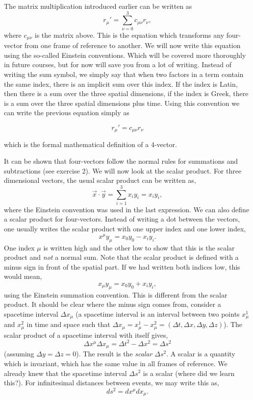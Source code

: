 {\begin{multicols}{2}
The matrix multiplication introduced earlier can be written as
\[
r_\mu'=\sum_{\nu=0}^3c_{\mu\nu}r_\nu,
\]
where $c_{\mu\nu}$ is the matrix above. This is the equation which transforms any four-vector from one frame of reference to another. We will now write this equation using the so-called Einstein conventions. Which will be covered more thoroughly in future courses, but for now will save you from a lot of writing. Instead of writing the sum symbol, we simply say that when two factors in a term contain the same index, there is an implicit sum over this index. If the index is Latin, then there is a sum over the three spatial dimensions, if the index is Greek, there is a sum over the three spatial dimensions plus time. Using this convention we can write the previous equation simply as
\begin{formbox}
\begin{equation}
\label{eq:lorentz}
r_\mu'=c_{\mu\nu}r_\nu
\end{equation}
\end{formbox}
which is the formal mathematical definition of a 4-vector.

It can be shown that four-vectors follow the normal rules for summations and subtractions (see exercise 2). We will now look at the scalar product. For three dimensional vectors, the usual scalar product can be written as,
\[
\vec{x}\cdot\vec{y}=\sum_{i=1}^3x_iy_i=x_iy_i,
\]
where the Einstein convention was used in the last expression. We can also define a scalar product for four-vectors. Instead of writing a dot between the vectors, one usually writes the scalar product with one upper index and one lower index,
\[
x^\mu y_\mu=x_0y_0-x_iy_i.
\]
One index $\mu$ is written high and the other low to show that this is the scalar product and \emph{not} a normal sum. Note that the scalar product is defined with a minus sign in front of the spatial part. If we had written both indices low, this would mean,
\[
x_\mu y_\mu=x_0y_0+x_iy_i,
\]
using the Einstein summation convention. This is different from the scalar product. It should be clear where the minus sign comes from, consider a spacetime interval $\Delta x_\mu$ (a spacetime interval is an interval between two points $x_\mu^1$ and $x_\mu^2$ in time and space such that $\Delta x_\mu=x_\mu^1-x_\mu^2=(\Delta t,\Delta x,\Delta y,\Delta z)$). The scalar product of a spacetime interval with itself gives,
\[
\Delta x^\mu\Delta x_\mu=\Delta t^2-\Delta x^2=\Delta s^2
\]
(assuming $\Delta y=\Delta z=0$). The result is the {\it scalar\label{pg:scalar}} $\Delta s^2$. A scalar is a quantity which is invariant, which has the same value in all frames of reference. We already knew that the spacetime interval $\Delta s^2$ is a scalar (where did we learn this?). For infinitesimal distances between events, we may write this as,
\[
ds^2=dx^\mu dx_\mu.
\]


\end{multicols}}
